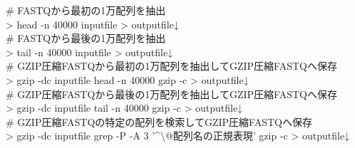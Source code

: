 \documentclass[titlepage,10pt,a4paper,english]{jsbook}
\newenvironment{cmd}{\begin{oframed}\raggedright\ttfamily\footnotesize\setlength{\baselineskip}{1.4em}}{\end{oframed}\vspace{-1em}}
\begin{document}
\begin{cmd}
\# FASTQから最初の1万配列を抽出\\
{\textgreater} head -n 40000 inputfile {\textgreater} outputfile↓\\
\# FASTQから最後の1万配列を抽出\\
{\textgreater} tail -n 40000 inputfile {\textgreater} outputfile↓\\
\# GZIP圧縮FASTQから最初の1万配列を抽出してGZIP圧縮FASTQへ保存\\
{\textgreater} gzip -dc inputfile {\textbar} head -n 40000 {\textbar} gzip -c {\textgreater} outputfile↓\\
\# GZIP圧縮FASTQから最後の1万配列を抽出してGZIP圧縮FASTQへ保存\\
{\textgreater} gzip -dc inputfile {\textbar} tail -n 40000 {\textbar} gzip -c {\textgreater} outputfile↓\\
\# GZIP圧縮FASTQの特定の配列を検索してGZIP圧縮FASTQへ保存\\
{\textgreater} gzip -dc inputfile {\textbar} grep -P -A 3 '{\textasciicircum}{\textbackslash}@配列名の正規表現' {\textbar} gzip -c {\textgreater} outputfile↓
\end{cmd}
\end{document}
